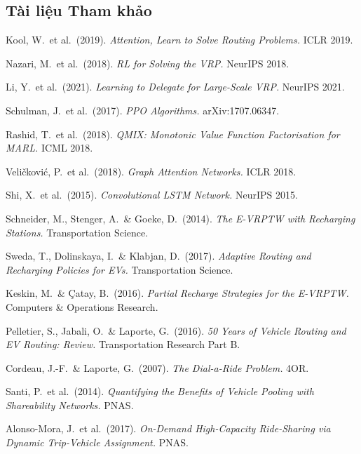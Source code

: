 \documentclass[12pt,a4paper]{article}
\begin{document}
\subsection{Tài liệu Tham khảo}

\begin{enumerate}[label={[\arabic*]}, leftmargin=3em, itemsep=2pt]
  \item Kool, W.\ et al.\ (2019). \textit{Attention, Learn to Solve Routing Problems.}
        ICLR 2019.
  \item Nazari, M.\ et al.\ (2018). \textit{RL for Solving the VRP.} NeurIPS 2018.
  \item Li, Y.\ et al.\ (2021). \textit{Learning to Delegate for Large-Scale VRP.}
        NeurIPS 2021.
  \item Schulman, J.\ et al.\ (2017). \textit{PPO Algorithms.} arXiv:1707.06347.
  \item Rashid, T.\ et al.\ (2018). \textit{QMIX: Monotonic Value Function
        Factorisation for MARL.} ICML 2018.
  \item Veličković, P.\ et al.\ (2018). \textit{Graph Attention Networks.} ICLR 2018.
  \item Shi, X.\ et al.\ (2015). \textit{Convolutional LSTM Network.} NeurIPS 2015.
  \item Schneider, M., Stenger, A.\ \& Goeke, D.\ (2014).
        \textit{The E-VRPTW with Recharging Stations.} Transportation Science.
  \item Sweda, T., Dolinskaya, I.\ \& Klabjan, D.\ (2017).
        \textit{Adaptive Routing and Recharging Policies for EVs.}
        Transportation Science.
  \item Keskin, M.\ \& Çatay, B.\ (2016).
        \textit{Partial Recharge Strategies for the E-VRPTW.}
        Computers \& Operations Research.
  \item Pelletier, S., Jabali, O.\ \& Laporte, G.\ (2016).
        \textit{50 Years of Vehicle Routing and EV Routing: Review.}
        Transportation Research Part B.
  \item Cordeau, J.-F.\ \& Laporte, G.\ (2007).
        \textit{The Dial-a-Ride Problem.} 4OR.
  \item Santi, P.\ et al.\ (2014).
        \textit{Quantifying the Benefits of Vehicle Pooling with
        Shareability Networks.} PNAS.
  \item Alonso-Mora, J.\ et al.\ (2017).
        \textit{On-Demand High-Capacity Ride-Sharing via Dynamic
        Trip-Vehicle Assignment.} PNAS.

\end{enumerate}
\end{document}
